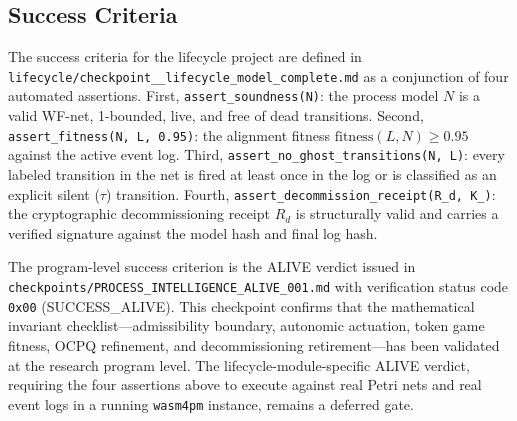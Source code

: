 \subsection{Success Criteria}
\label{sec:lifecycle-question-success}

The success criteria for the lifecycle project are defined in
\texttt{lifecycle/checkpoint\_\_lifecycle\_model\_complete.md} as a conjunction of four
automated assertions. First, \texttt{assert\_soundness(N)}: the process model $N$ is a
valid WF-net, 1-bounded, live, and free of dead transitions. Second,
\texttt{assert\_fitness(N, L, 0.95)}: the alignment fitness $\mathrm{fitness}(L, N) \geq
0.95$ against the active event log. Third,
\texttt{assert\_no\_ghost\_transitions(N, L)}: every labeled transition in the net is
fired at least once in the log or is classified as an explicit silent ($\tau$) transition.
Fourth, \texttt{assert\_decommission\_receipt(R\_d, K\_)}: the
cryptographic decommissioning receipt $R_d$ is structurally valid and carries a verified
signature against the model hash and final log hash.

The program-level success criterion is the ALIVE verdict issued in
\texttt{checkpoints/PROCESS\_INTELLIGENCE\_ALIVE\_001.md} with verification status code
\texttt{0x00} (SUCCESS\_ALIVE). This checkpoint confirms that the mathematical invariant
checklist---admissibility boundary, autonomic actuation, token game fitness, OCPQ
refinement, and decommissioning retirement---has been validated at the research program
level. The lifecycle-module-specific ALIVE verdict, requiring the four assertions above
to execute against real Petri nets and real event logs in a running \texttt{wasm4pm}
instance, remains a deferred gate.
